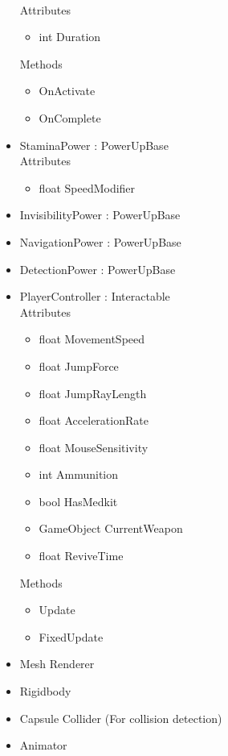 \documentclass[11pt]{article}
\begin{document}
\begin{itemize}
\\Attributes
\begin{itemize}
\item int Duration
\end{itemize}
Methods
\begin{itemize}
\item OnActivate
\item OnComplete
\end{itemize}
\item StaminaPower : PowerUpBase
\\Attributes
\begin{itemize}
\item float SpeedModifier
\end{itemize}
\item InvisibilityPower : PowerUpBase
\item NavigationPower : PowerUpBase
\item DetectionPower : PowerUpBase
\item PlayerController : Interactable
\\Attributes
\begin{itemize}
\item float MovementSpeed
\item float JumpForce
\item float JumpRayLength
\item float AccelerationRate
\item float MouseSensitivity
\item int Ammunition
\item bool HasMedkit
\item GameObject CurrentWeapon
\item float ReviveTime
\end{itemize}
Methods
\begin{itemize}
\item Update
\item FixedUpdate
\end{itemize}
\item Mesh Renderer
\item Rigidbody
\item Capsule Collider (For collision detection)
\item Animator
\end{itemize}
\end{document}
